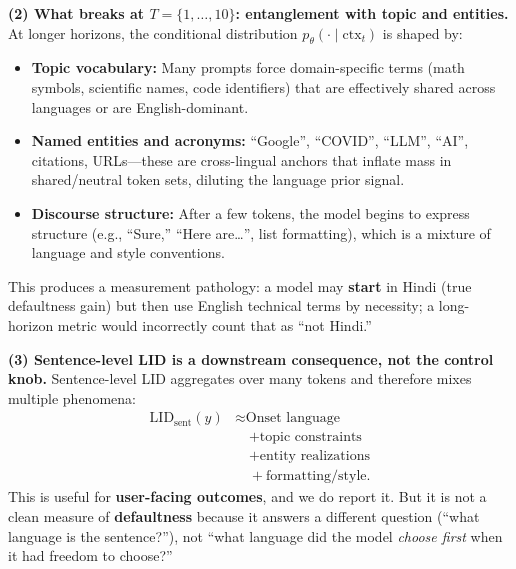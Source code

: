 \begin{itemize}[leftmargin=1.5em]
\begin{description}
\vspace{6pt}
\textbf{(2) What breaks at $T=\{1,\dots,10\}$: entanglement with topic and entities.}
At longer horizons, the conditional distribution $p_\theta(\cdot\mid\mathrm{ctx}_t)$ is shaped by:
\begin{itemize}[leftmargin=*,itemsep=2pt]
\item \textbf{Topic vocabulary:} Many prompts force domain-specific terms (math symbols, scientific names, code identifiers) that are effectively shared across languages or are English-dominant.
\item \textbf{Named entities and acronyms:} “Google”, “COVID”, “LLM”, “AI”, citations, URLs—these are cross-lingual anchors that inflate mass in shared/neutral token sets, diluting the language prior signal.
\item \textbf{Discourse structure:} After a few tokens, the model begins to express structure (e.g., “Sure,” “Here are…”, list formatting), which is a mixture of language and style conventions.
\end{itemize}
This produces a measurement pathology: a model may \textbf{start} in Hindi (true defaultness gain) but then use English technical terms by necessity; a long-horizon metric would incorrectly count that as “not Hindi.”

\vspace{6pt}
\textbf{(3) Sentence-level LID is a downstream consequence, not the control knob.}
Sentence-level LID aggregates over many tokens and therefore mixes multiple phenomena:
\begin{equation*}
\begin{aligned}
\mathrm{LID}_{\mathrm{sent}}(y)
&\approx \text{Onset language}  \\
&\quad + \text{topic constraints} \\
&\quad + \text{entity realizations} \\
&\quad + \text{formatting/style}.
\end{aligned}
\end{equation*}
This is useful for \textbf{user-facing outcomes}, and we do report it. But it is not a clean measure of \textbf{defaultness} because it answers a different question (“what language is the sentence?”), not “what language did the model \emph{choose first} when it had freedom to choose?”


\end{description}
\end{itemize}

